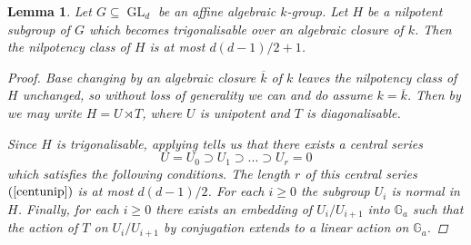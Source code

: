 \documentclass[twoside,a4paper,reqno,11pt]{amsart}
\DeclareMathOperator{\GL}{GL}
\newtheorem{lemma}[theorem]{Lemma}
\theoremstyle{definition}
\begin{document}
\begin{lemma}\label{trignilpotent} Let $G\subseteq\GL_d$ be an affine algebraic $k$-group. Let $H$ be a nilpotent subgroup of $G$ which becomes trigonalisable over an algebraic closure of $k$. Then the nilpotency class of $H$ is at most $d(d-1)/2+1$.
\begin{proof} Base changing by an algebraic closure $\overline{k}$ of $k$ leaves the nilpotency class of $H$ unchanged, so without loss of generality we can and do assume $k=\overline{k}$. Then by \cite[Thm.\ 16.26(a)]{Mi} we may write $H=U\rtimes T$, where $U$ is unipotent and $T$ is diagonalisable.

\vspace{2mm}\noindent Since $H$ is trigonalisable, applying \cite[6.49, Thm.\ 16.21 (and its proof)]{Mi} %
tells us that there exists a central series \begin{equation}\label{centunip} U=U_0 \supset U_1\supset...\supset U_r=0\end{equation} which satisfies the following conditions. The length $r$ of this central series $(\ref{centunip})$ is at most $d(d-1)/2$. For each $i\geq 0$ the subgroup $U_i$ is normal in $H$. Finally, for each $i\geq 0$ there exists an embedding of $U_i/U_{i+1}$ into $\mathbb{G}_a$ such that the action of $T$ on $U_i/U_{i+1}$ by conjugation extends to a linear action on $\mathbb{G}_a$. %


\end{proof}
\end{lemma}
\end{document}
